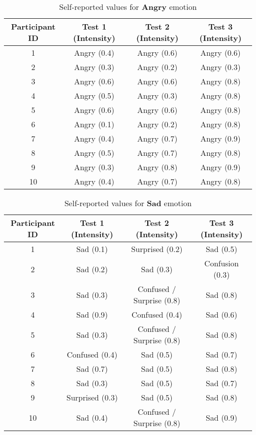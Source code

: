 \begin{table}[H]
    \centering
    \caption{Self-reported values for \textbf{Angry} emotion}
    \label{tab:angry-self-report}
    \begin{tabular}{|c|c|c|c|}
    \hline
    \textbf{Participant ID} & \textbf{Test 1 (Intensity)} & \textbf{Test 2 (Intensity)} & \textbf{Test 3 (Intensity)} \\
    \hline
    1 & Angry (0.4) & Angry (0.6) & Angry (0.6) \\
    2 & Angry (0.3) & Angry (0.2) & Angry (0.3) \\
    3 & Angry (0.6) & Angry (0.6) & Angry (0.8) \\
    4 & Angry (0.5) & Angry (0.3) & Angry (0.8) \\
    5 & Angry (0.6) & Angry (0.6) & Angry (0.8) \\
    6 & Angry (0.1) & Angry (0.2) & Angry (0.8) \\
    7 & Angry (0.4) & Angry (0.7) & Angry (0.9) \\
    8 & Angry (0.5) & Angry (0.7) & Angry (0.8) \\
    9 & Angry (0.3) & Angry (0.8) & Angry (0.9) \\
    10 & Angry (0.4) & Angry (0.7) & Angry (0.8) \\
    \hline
    \end{tabular}
    \end{table}
    
    \begin{table}[H]
    \centering
    \caption{Self-reported values for \textbf{Sad} emotion}
    \label{tab:sad-self-report}
    \begin{tabular}{|c|c|c|c|}
    \hline
    \textbf{Participant ID} & \textbf{Test 1 (Intensity)} & \textbf{Test 2 (Intensity)} & \textbf{Test 3 (Intensity)} \\
    \hline
    1 & Sad (0.1) & Surprised (0.2) & Sad (0.5) \\
    2 & Sad (0.2) & Sad (0.3) & Confusion (0.3) \\
    3 & Sad (0.3) & Confused / Surprise (0.8) & Sad (0.8) \\
    4 & Sad (0.9) & Confused (0.4) & Sad (0.6) \\
    5 & Sad (0.3) & Confused / Surprise (0.8) & Sad (0.8) \\
    6 & Confused (0.4) & Sad (0.5) & Sad (0.7) \\
    7 & Sad (0.7) & Sad (0.5) & Sad (0.8) \\
    8 & Sad (0.3) & Sad (0.5) & Sad (0.7) \\
    9 & Surprised (0.3) & Sad (0.5) & Sad (0.8) \\
    10 & Sad (0.4) & Confused / Surprise (0.8) & Sad (0.9) \\
    \hline
    \end{tabular}
\end{table}

